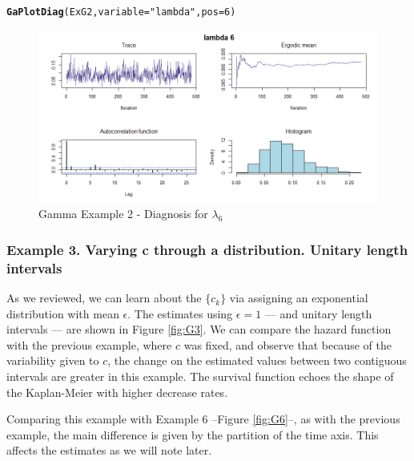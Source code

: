 \documentclass[letterpaper]{article}\usepackage[]{graphicx}\usepackage[]{color}
\makeatletter
\newcommand{\hlnum}[1]{\textcolor[rgb]{0.686,0.059,0.569}{#1}}%
\newcommand{\hlstr}[1]{\textcolor[rgb]{0.192,0.494,0.8}{#1}}%
\newcommand{\hlstd}[1]{\textcolor[rgb]{0.345,0.345,0.345}{#1}}%
\newcommand{\hlkwc}[1]{\textcolor[rgb]{0.333,0.667,0.333}{#1}}%
\newcommand{\hlkwd}[1]{\textcolor[rgb]{0.737,0.353,0.396}{\textbf{#1}}}%
\newenvironment{kframe}{%
 \def\at@end@of@kframe{}%
 \ifinner\ifhmode%
  \def\at@end@of@kframe{\end{minipage}}%
  \begin{minipage}{\columnwidth}%
 \fi\fi%
 \def\FrameCommand##1{\hskip\@totalleftmargin \hskip-\fboxsep
 \colorbox{shadecolor}{##1}\hskip-\fboxsep
     \hskip-\linewidth \hskip-\@totalleftmargin \hskip\columnwidth}%
 \MakeFramed {\advance\hsize-\width
   \@totalleftmargin\z@ \linewidth\hsize
   \@setminipage}}%
 {\par\unskip\endMakeFramed%
 \at@end@of@kframe}
\newenvironment{knitrout}{}{} %
\makeatother
\begin{document}
\begin{knitrout}
\color{fgcolor}\begin{kframe}
\begin{alltt}
\hlkwd{GaPlotDiag}\hlstd{(ExG2,} \hlkwc{variable} \hlstd{=} \hlstr{"lambda"}\hlstd{,} \hlkwc{pos} \hlstd{=} \hlnum{6}\hlstd{)}
\end{alltt}
\end{kframe}
\end{knitrout}

\begin{figure}
  \centering
  \includegraphics[width=\textwidth]{G23.png}
  \caption{Gamma Example 2 - Diagnosis for $\lambda_6$}
  \label{fig:G2a}
\end{figure}

\subsubsection{Example 3. Varying c through a distribution. Unitary length intervals}

As we reviewed, we can learn about the $\{c_k\}$ via assigning an exponential distribution with mean $\epsilon$. The estimates using $\epsilon = 1$ ---- and unitary length intervals ---- are shown in Figure \ref{fig:G3}. We can compare the hazard function with the previous example, where $c$ was fixed, and observe that because of the variability given to $c$, the change on the estimated values between two contiguous intervals are greater in this example. The survival function echoes the shape of the Kaplan-Meier with higher decrease rates. 

Comparing this example with Example 6 --Figure \ref{fig:G6}--, as with the previous example, the main difference is given by the partition of the time axis. This affects the estimates as we will note later.
\end{document}
